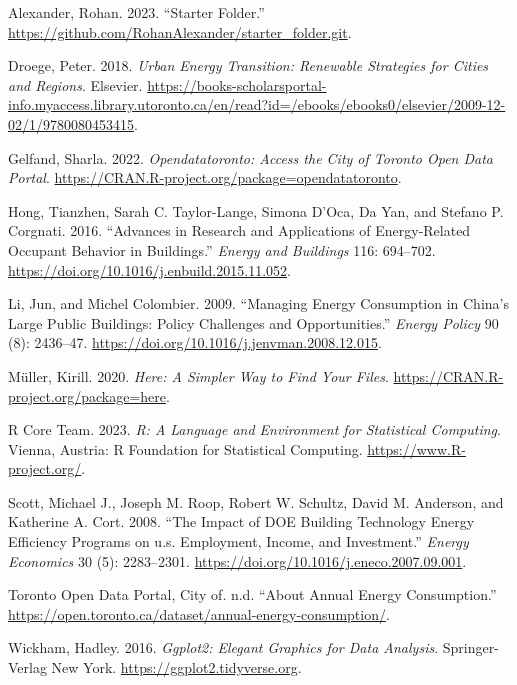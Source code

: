 \documentclass[
  letterpaper,
  DIV=11,
  numbers=noendperiod]{scrartcl}
\newlength{\cslhangindent}
\newenvironment{CSLReferences}[2] %
 {\begin{list}{}{%
  \setlength{\itemindent}{0pt}
  \setlength{\leftmargin}{0pt}
  \setlength{\parsep}{0pt}
  \ifodd #1
   \setlength{\leftmargin}{\cslhangindent}
   \setlength{\itemindent}{-1\cslhangindent}
  \fi
  \setlength{\itemsep}{#2\baselineskip}}}
 {\end{list}}
\begin{document}
\label{refs}
\begin{CSLReferences}{1}{0}
Alexander, Rohan. 2023. {``Starter Folder.''}
\url{https://github.com/RohanAlexander/starter_folder.git}.

Droege, Peter. 2018. \emph{Urban Energy Transition: Renewable Strategies
for Cities and Regions}. Elsevier.
\url{https://books-scholarsportal-info.myaccess.library.utoronto.ca/en/read?id=/ebooks/ebooks0/elsevier/2009-12-02/1/9780080453415}.

Gelfand, Sharla. 2022. \emph{Opendatatoronto: Access the City of Toronto
Open Data Portal}.
\url{https://CRAN.R-project.org/package=opendatatoronto}.

Hong, Tianzhen, Sarah C. Taylor-Lange, Simona D'Oca, Da Yan, and Stefano
P. Corgnati. 2016. {``Advances in Research and Applications of
Energy-Related Occupant Behavior in Buildings.''} \emph{Energy and
Buildings} 116: 694--702.
\url{https://doi.org/10.1016/j.enbuild.2015.11.052}.

Li, Jun, and Michel Colombier. 2009. {``Managing Energy Consumption in
China's Large Public Buildings: Policy Challenges and Opportunities.''}
\emph{Energy Policy} 90 (8): 2436--47.
\url{https://doi.org/10.1016/j.jenvman.2008.12.015}.

Müller, Kirill. 2020. \emph{Here: A Simpler Way to Find Your Files}.
\url{https://CRAN.R-project.org/package=here}.

R Core Team. 2023. \emph{R: A Language and Environment for Statistical
Computing}. Vienna, Austria: R Foundation for Statistical Computing.
\url{https://www.R-project.org/}.

Scott, Michael J., Joseph M. Roop, Robert W. Schultz, David M. Anderson,
and Katherine A. Cort. 2008. {``The Impact of DOE Building Technology
Energy Efficiency Programs on u.s. Employment, Income, and
Investment.''} \emph{Energy Economics} 30 (5): 2283--2301.
\url{https://doi.org/10.1016/j.eneco.2007.09.001}.

Toronto Open Data Portal, City of. n.d. {``About Annual Energy
Consumption.''}
\url{https://open.toronto.ca/dataset/annual-energy-consumption/}.

Wickham, Hadley. 2016. \emph{Ggplot2: Elegant Graphics for Data
Analysis}. Springer-Verlag New York.
\url{https://ggplot2.tidyverse.org}.


\end{CSLReferences}
\end{document}
